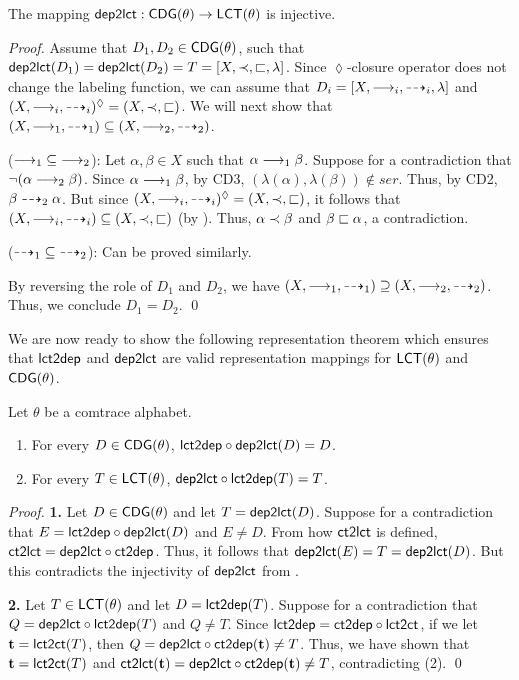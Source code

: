 \documentclass{llncs}
\begin{document}
\begin{lemma} The mapping  $\mathsf{dep2lct}:\mathsf{CDG}(\theta)\rightarrow \mathsf{LCT}(\theta)$ is injective.
\label{lem:dlinj}
\end{lemma}
\begin{proof} Assume that $D_1,D_2 \in \mathsf{CDG}(\theta)$, such that $\mathsf{dep2lct}(D_1)=\mathsf{dep2lct}(D_2) = T= [X,\prec,\sqsubset,\lambda]$. Since $\lozenge$-closure operator does not change the labeling function, we can assume that $D_i= [X,\longrightarrow_i,\dashrightarrow_i,\lambda]$ and $(X,\longrightarrow_i,\dashrightarrow_i)^{\lozenge} = (X,\prec,\sqsubset)$. We will next show that $(X,\longrightarrow_1,\dashrightarrow_1)\subseteq(X,\longrightarrow_2,\dashrightarrow_2)$.

($\longrightarrow_1\;\subseteq\;\longrightarrow_2$): Let $\alpha,\beta\in X$ such that $\alpha \longrightarrow_1 \beta$. Suppose for a contradiction that $\neg (\alpha \longrightarrow_2 \beta)$. Since $\alpha \longrightarrow_1 \beta$, by \textsf{CD3},  $(\lambda(\alpha),\lambda(\beta))\not\in ser$. Thus, by \textsf{CD2}, $\beta \dashrightarrow_2 \alpha$. But since $(X,\longrightarrow_i,\dashrightarrow_i)^{\lozenge} = (X,\prec,\sqsubset)$, it follows that $(X,\longrightarrow_i,\dashrightarrow_i) \subseteq (X,\prec,\sqsubset)$ (by ). Thus, $\alpha\prec\beta$ and $\beta \sqsubset \alpha$, a contradiction.

($\dashrightarrow_1\;\subseteq\;\dashrightarrow_2$): Can be proved similarly.

By reversing the role of $D_1$ and $D_2$, we have $(X,\longrightarrow_1,\dashrightarrow_1)\supseteq(X,\longrightarrow_2,\dashrightarrow_2)$. Thus, we conclude $D_1=D_2$.
\qed
\end{proof}

We are now ready to show the following representation theorem which ensures that $\mathsf{lct2dep}$ and $\mathsf{dep2lct}$ are valid representation mappings for $\mathsf{LCT}(\theta)$ and $\mathsf{CDG}(\theta)$.

\begin{theorem} Let $\theta$ be a comtrace alphabet.
\begin{enumerate}
\item For every $D\in \mathsf{CDG}(\theta)$, $\mathsf{lct2dep} \circ \mathsf{dep2lct}(D) = D$.
\item For every $T\in \mathsf{LCT}(\theta)$, $\mathsf{dep2lct} \circ \mathsf{lct2dep}(T) = T$.
\end{enumerate}
\label{theo:deprep}
\end{theorem}
\begin{proof}\textbf{1. } Let $D \in \mathsf{CDG}(\theta)$ and let $T = \mathsf{dep2lct}(D)$. Suppose for a contradiction that $E =\mathsf{lct2dep} \circ \mathsf{dep2lct}(D)$ and $E\not = D$. From how $\mathsf{ct2lct}$ is defined, $\mathsf{ct2lct} = \mathsf{dep2lct}\circ \mathsf{ct2dep}$. Thus, it follows that $\mathsf{dep2lct}(E)= T = \mathsf{dep2lct}(D)$. But this contradicts the injectivity of $\mathsf{dep2lct}$ from .

\textbf{2. } Let $T\in \mathsf{LCT}(\theta)$ and let $D = \mathsf{lct2dep}(T)$. Suppose for a contradiction that $Q = \mathsf{dep2lct} \circ \mathsf{lct2dep}(T)$ and $Q\not= T$. Since $\mathsf{lct2dep} = \mathsf{ct2dep}\circ \mathsf{lct2ct}$, if we let $\mathbf{t}= \mathsf{lct2ct}(T)$, then  $Q = \mathsf{dep2lct}\circ \mathsf{ct2dep} (\mathbf{t})\not= T$. Thus, we have shown that $\mathbf{t}=\mathsf{lct2ct}(T)$ and $\mathsf{ct2lct}(\mathbf{t})=\mathsf{dep2lct}\circ \mathsf{ct2dep} (\mathbf{t})\not= T$, contradicting  (2).
\qed 
\end{proof}
\end{document}
